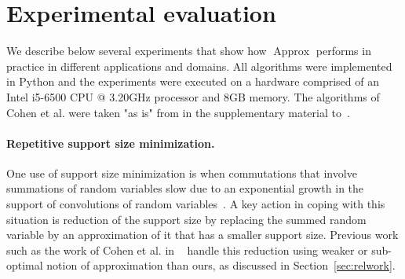 \documentclass[letterpaper]{article} %
\newtheorem{theorem}[thm]{Theorem}
\DeclareMathOperator{\support}{support}
\DeclareMathOperator{\KlmApprox}{Approx}
\begin{document}






\section{Experimental evaluation}\label{sec:exp}

We describe below several experiments that show how $\KlmApprox$ performs in practice in different applications and domains.
All algorithms were implemented in Python and the experiments were executed on a hardware comprised of an Intel i5-6500 CPU @ 3.20GHz processor and 8GB memory. The algorithms of Cohen et al. were taken "as is" from in the supplementary material to~\cite{cohen2015estimating}.

\paragraph{Repetitive support size minimization.} One use of support size minimization is when commutations that involve summations of random variables slow due to an exponential growth in the support of convolutions of random variables~\cite{cohen2015estimating}. A key action in coping with this situation is reduction of the  support size by replacing the summed random variable by an approximation of it that has a smaller support size. Previous work such as the work of Cohen et al. in ~\cite{cohen2015estimating,CohenGW18} handle this reduction using weaker or sub-optimal notion of approximation than ours, as discussed in Section~\ref{sec:relwork}. 
\end{document}
